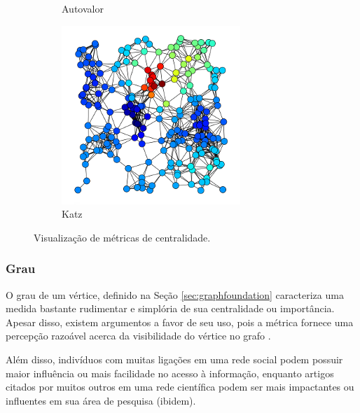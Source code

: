 \begin{figure}[ht]
\begin{subfigure}{0.27\textwidth}
        \caption{Autovalor} \label{fig:eigenvector}
    \end{subfigure}
    \begin{subfigure}{0.27\textwidth}
        \includegraphics[width=\linewidth]{imagens/katz.png}
        \caption{Katz} \label{fig:katz}
    \end{subfigure}
    
    \vspace*{0.3cm}
    \RaggedRight
    \caption{Visualização de métricas de centralidade.}
    \label{fig:centralities}
\end{figure}

\subsubsection{Grau} \label{sec:degree}

O grau de um vértice, definido na Seção \ref{sec:graphfoundation} caracteriza uma medida bastante rudimentar e simplória de sua centralidade ou importância. Apesar disso, existem argumentos a favor de seu uso, pois a métrica fornece uma percepção razoável acerca da visibilidade do vértice no grafo \cite{Newman2010}.

Além disso, indivíduos com muitas ligações em uma rede social podem possuir maior influência ou mais facilidade no acesso à informação, enquanto artigos citados por muitos outros em uma rede científica podem ser mais impactantes ou influentes em sua área de pesquisa (ibidem).

